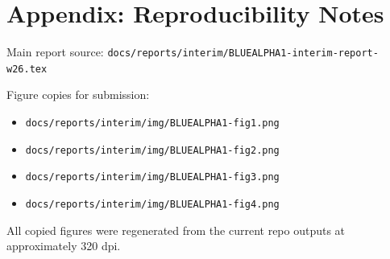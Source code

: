 ﻿\documentclass[11pt]{article}
\begin{document}
\section*{Appendix: Reproducibility Notes}
Main report source: \texttt{docs/reports/interim/BLUEALPHA1-interim-report-w26.tex}

Figure copies for submission:
\begin{itemize}
  \item \texttt{docs/reports/interim/img/BLUEALPHA1-fig1.png}
  \item \texttt{docs/reports/interim/img/BLUEALPHA1-fig2.png}
  \item \texttt{docs/reports/interim/img/BLUEALPHA1-fig3.png}
  \item \texttt{docs/reports/interim/img/BLUEALPHA1-fig4.png}
\end{itemize}

All copied figures were regenerated from the current repo outputs at approximately 320 dpi.
\end{document}
